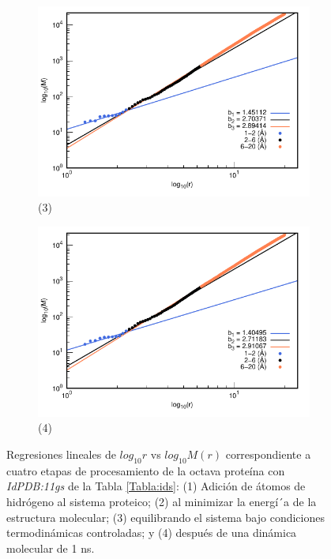 \begin{figure}[H]
			\vspace{0cm} %
			
			\hspace{-0.3cm} 
			\begin{subfigure}{0.49\textwidth}
				\centering
				\includegraphics[width=\linewidth,page=1]{graphs/PDBs/11gs/11gsEq.pdf}
				\caption{(3)}
			\end{subfigure}
			\hspace{0.2cm}
			\begin{subfigure}{0.49\textwidth} %
				\centering
				\includegraphics[width=\linewidth,page=1]{graphs/PDBs/11gs/11gs1ns.pdf}
				\caption{(4)}
			\end{subfigure}
			
			\caption{Regresiones lineales de $log_{10}r$ vs $log_{10}M(r)$ correspondiente a cuatro etapas de procesamiento de la octava prote\'{i}na con \textit{IdPDB:11gs} de la Tabla \ref{Tabla:ids}: (1) Adici\'{o}n de \'{a}tomos de hidr\'{o}geno al sistema proteico; (2) al minimizar la energ\'{i´}a de la estructura molecular; (3) equilibrando el sistema bajo condiciones termodin\'{a}micas controladas; y (4) despu\'{e}s de una din\'{a}mica molecular de 1 ns.}
			\label{fig:11gs}
		\end{figure}
		